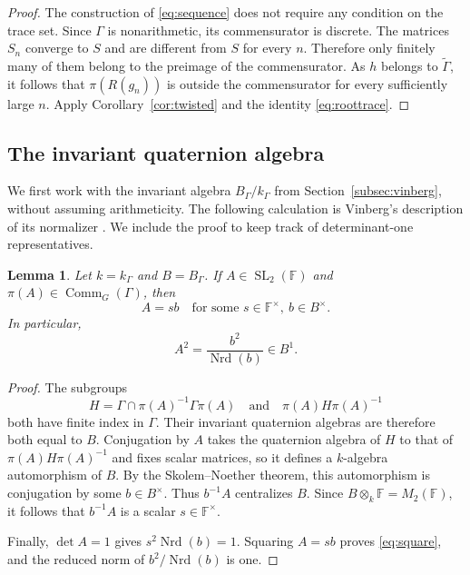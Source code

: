 \documentclass[reqno]{amsart}
\newtheorem{lemma}[theorem]{Lemma}
\theoremstyle{remark}
\DeclareMathOperator{\Nrd}{Nrd}
\DeclareMathOperator{\Comm}{Comm}
\DeclareMathOperator{\SL}{SL}
\newcommand{\F}{\mathbb F}
\newcommand{\G}{\widetilde\Gamma}
\begin{document}
\begin{proof}
The construction of \eqref{eq:sequence} does not require any condition on the trace set. Since $\Gamma$ is nonarithmetic, its commensurator is discrete. The matrices $S_n$ converge to $S$ and are different from $S$ for every $n$. Therefore only finitely many of them belong to the preimage of the commensurator. As $h$ belongs to $\G$, it follows that $\pi(R(g_n))$ is outside the commensurator for every sufficiently large $n$. Apply Corollary~\ref{cor:twisted} and the identity \eqref{eq:roottrace}.
\end{proof}

\subsection{The invariant quaternion algebra}\label{subsec:containment}

We first work with the invariant algebra $B_\Gamma/k_\Gamma$ from Section~\ref{subsec:vinberg}, without assuming arithmeticity. The following calculation is Vinberg's description of its normalizer \cite[p.~186, equations (19)--(20)]{Vinberg}. We include the proof to keep track of determinant-one representatives.

\begin{lemma}\label{lem:rational}
Let $k=k_\Gamma$ and $B=B_\Gamma$. If $A\in\SL_2(\F)$ and $\pi(A)\in\Comm_G(\Gamma)$, then
$$
A=s b\quad\text{for some }s\in\F^\times,\ b\in B^\times.
$$
In particular,
\begin{equation}\label{eq:square}
A^2=\frac{b^2}{\Nrd(b)}\in B^1.
\end{equation}
\end{lemma}

\begin{proof}
The subgroups
$$
H=\Gamma\cap \pi(A)^{-1}\Gamma \pi(A) \quad\text{and}\quad \pi(A) H \pi(A)^{-1}
$$
both have finite index in $\Gamma$. Their invariant quaternion algebras are therefore both equal to $B$. Conjugation by $A$ takes the quaternion algebra of $H$ to that of $\pi(A) H \pi(A)^{-1}$ and fixes scalar matrices, so it defines a $k$-algebra automorphism of $B$. By the Skolem--Noether theorem, this automorphism is conjugation by some $b\in B^\times$. Thus $b^{-1}A$ centralizes $B$. Since $B\otimes_k\F=M_2(\F)$, it follows that $b^{-1}A$ is a scalar $s\in\F^\times$.

Finally, $\det A=1$ gives $s^2\Nrd(b)=1$. Squaring $A=sb$ proves \eqref{eq:square}, and the reduced norm of $b^2/\Nrd(b)$ is one.
\end{proof}
\end{document}
